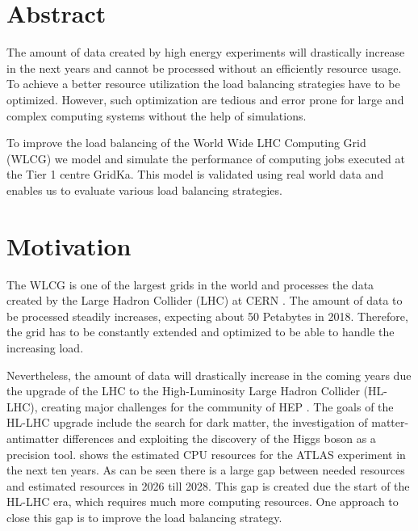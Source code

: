 \chapter{Abstract}
The amount of data created by high energy experiments will drastically increase in the next years and cannot be processed without an efficiently resource usage.
To achieve a better resource utilization the load balancing strategies have to be optimized.
However, such optimization are tedious and error prone for large and complex computing systems without the help of simulations.

To improve the load balancing of the World Wide LHC Computing Grid (WLCG) we model and simulate the performance of computing jobs executed at the Tier 1 centre GridKa.
This model is validated using real world data and enables us to evaluate various load balancing strategies.


\chapter{Motivation}
The WLCG is one of the largest grids in the world and processes the data created by the Large Hadron Collider (LHC) at CERN \cite{wlcg_update}. 
The amount of data to be processed steadily increases, expecting about 50 Petabytes in 2018. Therefore, the grid has to be constantly extended and optimized to be able to handle the increasing load.

Nevertheless, the amount of data will drastically increase in the coming years due the upgrade of the LHC to the High-Luminosity Large Hadron Collider (HL-LHC), creating major challenges for the community of HEP \cite{community}.
The goals of the HL-LHC upgrade include the search for dark matter, the investigation of matter-antimatter differences and exploiting the discovery of the Higgs boson as a precision tool.
 shows the estimated CPU resources for the ATLAS experiment in the next ten years. As can be seen there is a large gap between needed resources and estimated resources in 2026 till 2028. This gap is created due the start of the HL-LHC era, which requires much more computing resources. One approach to close this gap is to improve the load balancing strategy. 

